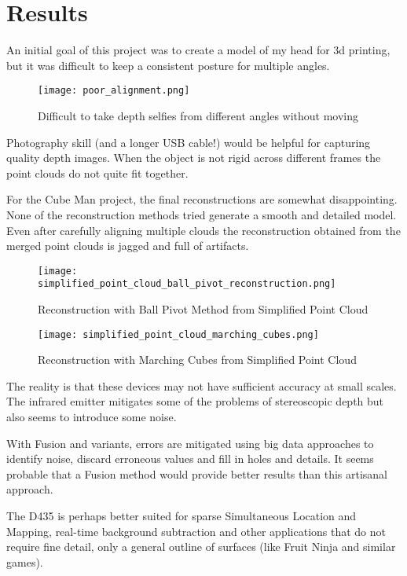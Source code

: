 \section{Results}

An initial goal of this project was to create a model of my head for 3d printing,
but it was difficult to keep a consistent posture for multiple angles.

\begin{figure}[h]
\centering
\texttt{[image: poor\_alignment.png]}
\caption{Difficult to take depth selfies from different angles without moving}
\end{figure}

Photography skill (and a longer USB cable!) would be helpful for capturing quality depth images.
When the object is not rigid across different frames the point clouds do not quite fit together.

For the Cube Man project, the final reconstructions are somewhat disappointing.
None of the reconstruction methods tried generate a smooth and detailed model.
Even after carefully aligning multiple clouds the reconstruction obtained
from the merged point clouds is jagged and full of artifacts.

\begin{figure}[H]
\centering
\texttt{[image: simplified\_point\_cloud\_ball\_pivot\_reconstruction.png]}
\caption{Reconstruction with Ball Pivot Method from Simplified Point Cloud }
\end{figure}


\begin{figure}[H]
\centering
\texttt{[image: simplified\_point\_cloud\_marching\_cubes.png]}
\caption{Reconstruction with Marching Cubes from Simplified Point Cloud }
\end{figure}

The reality is that these devices may not have sufficient accuracy at small scales.
The infrared emitter mitigates some of the problems of stereoscopic depth but
also seems to introduce some noise.

With Fusion and variants, errors are mitigated using big data approaches to identify noise,
discard erroneous values and fill in holes and details. It seems probable that a Fusion method \cite{newcombe2011kinectfusion}
 would provide better results than this artisanal approach.

The D435 is perhaps better suited for sparse Simultaneous Location and Mapping, real-time background subtraction and other applications that do not require fine detail, only a general outline of
surfaces (like Fruit Ninja and similar games).
